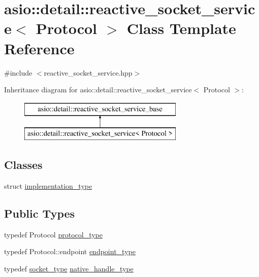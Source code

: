 \hypertarget{classasio_1_1detail_1_1reactive__socket__service}{}\section{asio\+:\+:detail\+:\+:reactive\+\_\+socket\+\_\+service$<$ Protocol $>$ Class Template Reference}
\label{classasio_1_1detail_1_1reactive__socket__service}


{\ttfamily \#include $<$reactive\+\_\+socket\+\_\+service.\+hpp$>$}

Inheritance diagram for asio\+:\+:detail\+:\+:reactive\+\_\+socket\+\_\+service$<$ Protocol $>$\+:\begin{figure}[H]
\begin{center}
\leavevmode
\includegraphics[height=2.000000cm]{classasio_1_1detail_1_1reactive__socket__service}
\end{center}
\end{figure}
\subsection*{Classes}
\begin{DoxyCompactItemize}
\item 
struct \hyperlink{structasio_1_1detail_1_1reactive__socket__service_1_1implementation__type}{implementation\+\_\+type}
\end{DoxyCompactItemize}
\subsection*{Public Types}
\begin{DoxyCompactItemize}
\item 
typedef Protocol \hyperlink{classasio_1_1detail_1_1reactive__socket__service_a622bd8618dbd40771a5b6a66eb1b75e9}{protocol\+\_\+type}
\item 
typedef Protocol\+::endpoint \hyperlink{classasio_1_1detail_1_1reactive__socket__service_adad302be53c8a4ea6e7693bc88595381}{endpoint\+\_\+type}
\item 
typedef \hyperlink{namespaceasio_1_1detail_a6798c771dd84b79798b1a08150706ea9}{socket\+\_\+type} \hyperlink{classasio_1_1detail_1_1reactive__socket__service_a2fc869359f3eb7b6f25925f10e594e1d}{native\+\_\+handle\+\_\+type}
\end{DoxyCompactItemize}
